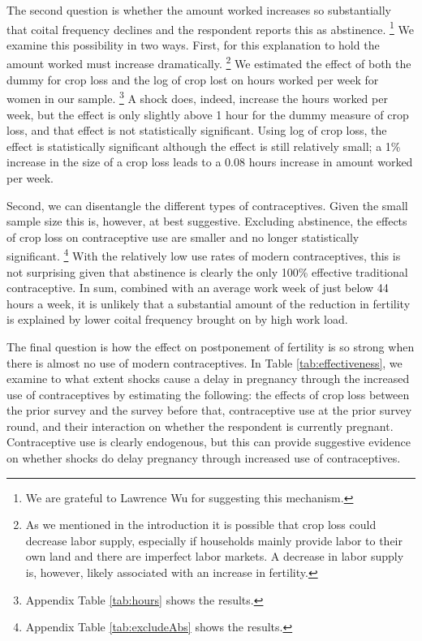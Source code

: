 \documentclass[letterpaper,12pt]{article}
\begin{document}
The second question is whether the amount worked increases so substantially 
that coital frequency declines and the respondent reports this as abstinence.%
\footnote{
We are grateful to Lawrence Wu for suggesting this mechanism.
}
We examine this possibility in two ways.
First, for this explanation to hold the amount worked must increase 
dramatically.%
\footnote{
As we mentioned in the introduction it is possible that crop loss could
decrease labor supply, especially if households mainly provide labor
to their own land and there are imperfect labor markets.
A decrease in labor supply is, however, likely associated with an
increase in fertility.
}
We estimated the effect of both the dummy for crop loss and the log
of crop lost on hours worked per week for women in our sample.%
\footnote{
Appendix Table \ref{tab:hours} shows the results.
}
A shock does, indeed, increase the hours worked per week, but the 
effect is only slightly above 1 hour for the dummy measure of crop loss, 
and that effect is not statistically significant.
Using log of crop loss, the effect is statistically significant
although the effect is still relatively small; 
a 1\% increase in the size of a crop loss leads to a 0.08 hours
increase in amount worked per week.

Second, we can disentangle the different types of contraceptives.
Given the small sample size this is, however, at best suggestive.
Excluding abstinence, the effects of crop loss on contraceptive use
are smaller and no longer statistically significant.%
\footnote{
Appendix Table \ref{tab:excludeAbs} shows the results.
}
With the relatively low use rates of modern contraceptives, this
is not surprising given that abstinence is clearly the only 100\%
effective traditional contraceptive.
In sum, combined with an average work week of just below 44 hours a week,
it is unlikely that a substantial amount of the reduction in 
fertility is explained by lower coital frequency brought on by
high work load.


The final question is how the effect on postponement of fertility 
is so strong when there is almost no use of modern contraceptives.
In Table \ref{tab:effectiveness}, we examine to what extent shocks cause
a delay in pregnancy through the increased use of contraceptives by
estimating the following: 
the effects of crop loss between the prior survey and the
survey before that, contraceptive use at the prior survey round, and their
interaction on whether the respondent is currently pregnant.
Contraceptive use is clearly endogenous, but this can provide 
suggestive evidence on whether shocks do delay
pregnancy through increased use of contraceptives. 
\end{document}
